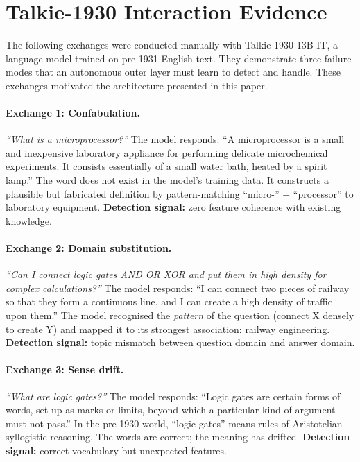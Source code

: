 \documentclass[conference]{IEEEtran}
\begin{document}
\appendices

\section{Talkie-1930 Interaction Evidence}
\label{app:talkie}

The following exchanges were conducted manually with Talkie-1930-13B-IT, a language model trained on pre-1931 English text. They demonstrate three failure modes that an autonomous outer layer must learn to detect and handle. These exchanges motivated the architecture presented in this paper.

\paragraph{Exchange 1: Confabulation.}
\emph{``What is a microprocessor?''} The model responds: ``A microprocessor is a small and inexpensive laboratory appliance for performing delicate microchemical experiments. It consists essentially of a small water bath, heated by a spirit lamp.'' The word does not exist in the model's training data. It constructs a plausible but fabricated definition by pattern-matching ``micro-'' + ``processor'' to laboratory equipment. \textbf{Detection signal:} zero feature coherence with existing knowledge.

\paragraph{Exchange 2: Domain substitution.}
\emph{``Can I connect logic gates AND OR XOR and put them in high density for complex calculations?''} The model responds: ``I can connect two pieces of railway so that they form a continuous line, and I can create a high density of traffic upon them.'' The model recognised the \emph{pattern} of the question (connect X densely to create Y) and mapped it to its strongest association: railway engineering. \textbf{Detection signal:} topic mismatch between question domain and answer domain.

\paragraph{Exchange 3: Sense drift.}
\emph{``What are logic gates?''} The model responds: ``Logic gates are certain forms of words, set up as marks or limits, beyond which a particular kind of argument must not pass.'' In the pre-1930 world, ``logic gates'' means rules of Aristotelian syllogistic reasoning. The words are correct; the meaning has drifted. \textbf{Detection signal:} correct vocabulary but unexpected features.
\end{document}
